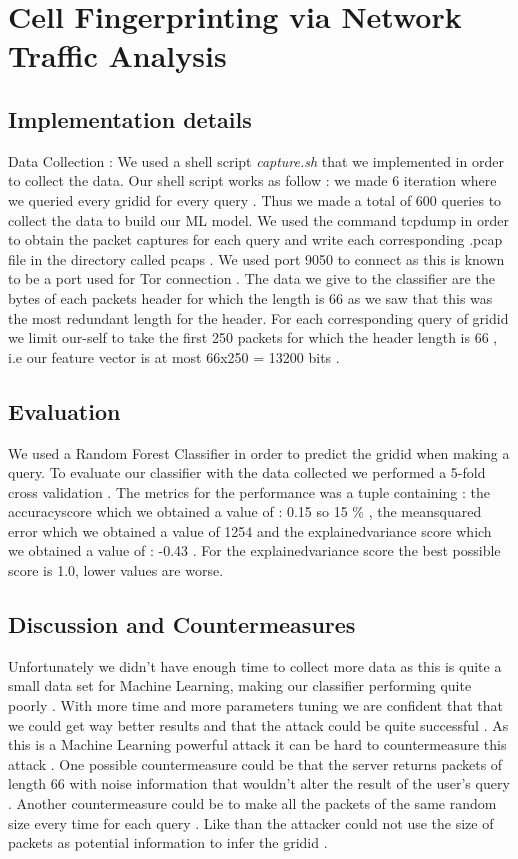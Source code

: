 \documentclass[10pt,conference,compsocconf]{IEEEtran}
\begin{document}
\section{Cell Fingerprinting via Network Traffic Analysis}
\subsection{Implementation details}
Data Collection : We used a shell script \emph{capture.sh} that we implemented in order to collect the data. Our shell script works as follow : we made 6 iteration where we queried  every grid\textunderscore id for every query . Thus we made a total of 600 queries to collect the data to build our ML model. We used the command tcpdump in order to obtain the packet captures for each query and write each corresponding .pcap file in the directory called pcaps . We used port 9050 to connect as this is known to be a port used for Tor connection . The data we give to the classifier are the bytes of each packets header for which the length is 66 as we saw that this was the most redundant length for the header. For each corresponding query of grid\textunderscore id we limit our-self to take the first 250 packets for which the header length is 66 , i.e our feature vector is at most 66x250 = 13200 bits .  

\subsection{Evaluation}
We used a Random Forest Classifier in order to predict the grid\textunderscore id when making a query. To evaluate our classifier with the data collected we performed a 5-fold cross validation . The metrics for the performance was a tuple containing : the accuracy\textunderscore score which we obtained a value of : 0.15 so 15 \% , the mean\textunderscore squared \textunderscore error which we obtained a value of 1254 and the explained\textunderscore variance \textunderscore score which we obtained a value of : -0.43 . For the explained\textunderscore variance \textunderscore score the best possible score is 1.0, lower values are worse.

\subsection{Discussion and Countermeasures}
Unfortunately we didn't have enough time to collect more data as this is quite a small data set for Machine Learning, making our classifier performing quite poorly . With more time and more parameters tuning we are confident that that we could get way better results and that the attack could be quite successful . 
As this is a Machine Learning powerful attack it can be hard to countermeasure this attack . One possible countermeasure could be that the server returns packets of length 66 with noise information that wouldn't alter the result of the user's query . Another countermeasure could be to make all the packets of the same random size every time for each query . Like than the attacker could not use the size of packets as potential information to infer the grid\textunderscore id .



\end{document}
